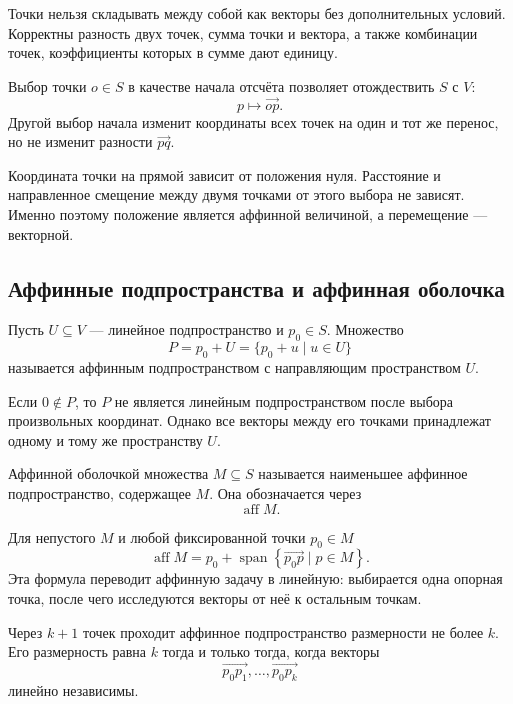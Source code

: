Точки нельзя складывать между собой как векторы без дополнительных условий. Корректны разность двух точек, сумма точки и вектора, а также комбинации точек, коэффициенты которых в сумме дают единицу.

Выбор точки \(o\in S\) в качестве начала отсчёта позволяет отождествить \(S\) с \(V\):
\[
p\longmapsto \overrightarrow{op}.
\]
Другой выбор начала изменит координаты всех точек на один и тот же перенос, но не изменит разности \(\overrightarrow{pq}\).

\begin{example}
Координата точки на прямой зависит от положения нуля. Расстояние и направленное смещение между двумя точками от этого выбора не зависят. Именно поэтому положение является аффинной величиной, а перемещение --- векторной.
\end{example}

\subsection{Аффинные подпространства и аффинная оболочка}

\begin{definition}
Пусть \(U\subseteq V\) --- линейное подпространство и \(p_0\in S\). Множество
\[
P=p_0+U
=
\{p_0+u\mid u\in U\}
\]
называется аффинным подпространством с направляющим пространством \(U\).
\end{definition}

Если \(0\notin P\), то \(P\) не является линейным подпространством после выбора произвольных координат. Однако все векторы между его точками принадлежат одному и тому же пространству \(U\).

\begin{definition}
Аффинной оболочкой множества \(M\subseteq S\) называется наименьшее аффинное подпространство, содержащее \(M\). Она обозначается через
\[
\operatorname{aff}M.
\]
\end{definition}

Для непустого \(M\) и любой фиксированной точки \(p_0\in M\)
\[
\operatorname{aff}M
=
p_0+
\operatorname{span}
\left\{
\overrightarrow{p_0p}\mid p\in M
\right\}.
\]
Эта формула переводит аффинную задачу в линейную: выбирается одна опорная точка, после чего исследуются векторы от неё к остальным точкам.

\begin{proposition}
Через \(k+1\) точек проходит аффинное подпространство размерности не более \(k\). Его размерность равна \(k\) тогда и только тогда, когда векторы
\[
\overrightarrow{p_0p_1},\dots,\overrightarrow{p_0p_k}
\]
линейно независимы.
\end{proposition}

